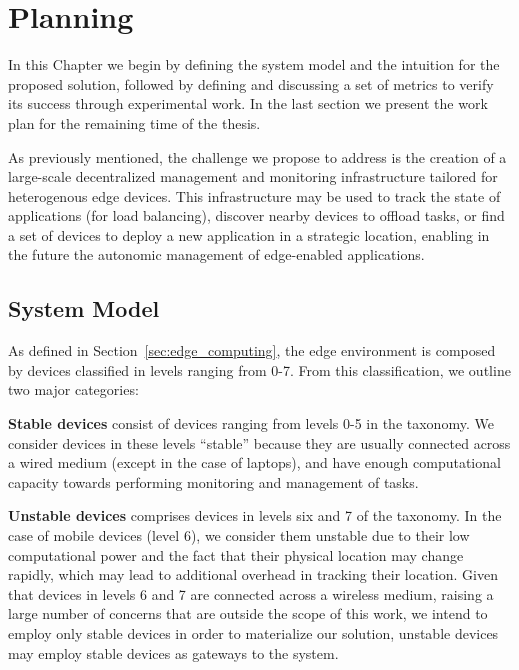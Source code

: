 \chapter{Planning} \label{cha:planning}

In this Chapter we begin by defining the system model and the intuition for the proposed solution, followed by defining and discussing a set of metrics to verify its success through experimental work. In the last section we present the work plan for the remaining time of the thesis. 

As previously mentioned, the challenge we propose to address is the creation of a large-scale decentralized management and monitoring infrastructure tailored for heterogenous edge devices. This infrastructure may be used to track the state of applications (for load balancing), discover nearby devices to offload tasks, or find a set of devices to deploy a new application in a strategic location, enabling in the future the autonomic management of edge-enabled applications.

\section{System Model}

As defined in Section~\ref{sec:edge_computing}, the edge environment is composed by devices classified in levels ranging from 0-7. From this classification, we outline two major categories:  

\textbf{Stable devices} consist of devices ranging from levels 0-5 in the taxonomy. We consider devices in these levels ``stable'' because they are usually connected across a wired medium (except in the case of laptops), and have enough computational capacity towards performing monitoring and management of tasks. 

\textbf{Unstable devices} comprises devices in levels six and 7 of the taxonomy. In the case of mobile devices (level 6), we consider them unstable due to their low computational power and the fact that their physical location may change rapidly, which may lead to additional overhead in tracking their location. Given that devices in levels 6 and 7 are connected across a wireless medium, raising a large number of concerns that are outside the scope of this work, we intend to employ only stable devices in order to materialize our solution, unstable devices may employ stable devices as gateways to the system.

